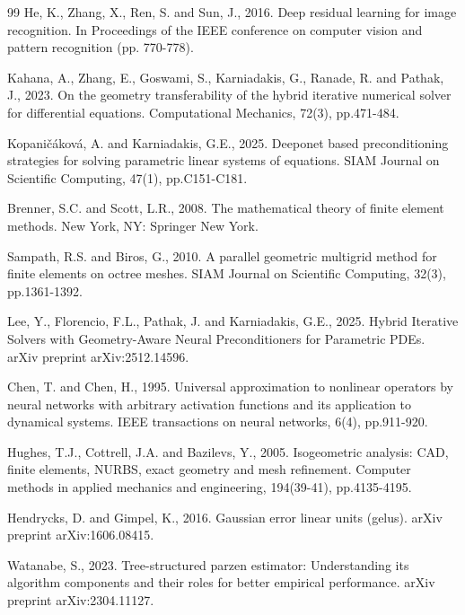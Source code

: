 \documentclass{article}
\theoremstyle{plain}
\numberwithin{equation}{section}
\begin{document}
\begin{thebibliography}{99}
    He, K., Zhang, X., Ren, S. and Sun, J., 2016. Deep residual learning for image recognition. In Proceedings of the IEEE conference on computer vision and pattern recognition (pp. 770-778).

    Kahana, A., Zhang, E., Goswami, S., Karniadakis, G., Ranade, R. and Pathak, J., 2023. On the geometry transferability of the hybrid iterative numerical solver for differential equations. Computational Mechanics, 72(3), pp.471-484.

    Kopaničáková, A. and Karniadakis, G.E., 2025. Deeponet based preconditioning strategies for solving parametric linear systems of equations. SIAM Journal on Scientific Computing, 47(1), pp.C151-C181.

    Brenner, S.C. and Scott, L.R., 2008. The mathematical theory of finite element methods. New York, NY: Springer New York.

    Sampath, R.S. and Biros, G., 2010. A parallel geometric multigrid method for finite elements on octree meshes. SIAM Journal on Scientific Computing, 32(3), pp.1361-1392.

    Lee, Y., Florencio, F.L., Pathak, J. and Karniadakis, G.E., 2025. Hybrid Iterative Solvers with Geometry-Aware Neural Preconditioners for Parametric PDEs. arXiv preprint arXiv:2512.14596.

    Chen, T. and Chen, H., 1995. Universal approximation to nonlinear operators by neural networks with arbitrary activation functions and its application to dynamical systems. IEEE transactions on neural networks, 6(4), pp.911-920.

    Hughes, T.J., Cottrell, J.A. and Bazilevs, Y., 2005. Isogeometric analysis: CAD, finite elements, NURBS, exact geometry and mesh refinement. Computer methods in applied mechanics and engineering, 194(39-41), pp.4135-4195.

    Hendrycks, D. and Gimpel, K., 2016. Gaussian error linear units (gelus). arXiv preprint arXiv:1606.08415.

    Watanabe, S., 2023. Tree-structured parzen estimator: Understanding its algorithm components and their roles for better empirical performance. arXiv preprint arXiv:2304.11127.


\end{thebibliography}
\end{document}
